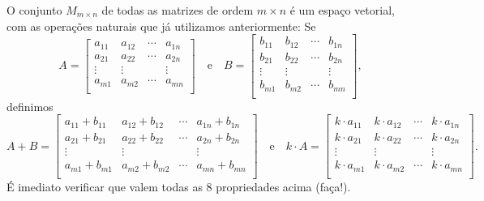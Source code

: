 \documentclass[../livro.tex]{subfiles}  %
\begin{document}
\begin{example}
	O conjunto $M_{m\times n}$ de todas as matrizes de ordem $m\times n$ é um espaço vetorial, com as operações naturais que já utilizamos anteriormente: Se
	\begin{equation}
	A =
	\left[
	\begin{array}{cccc}
	a_{11} & a_{12} & \cdots & a_{1n} \\
	a_{21} & a_{22} & \cdots & a_{2n} \\
	\vdots & \vdots &        & \vdots \\
	a_{m1} & a_{m2} & \cdots & a_{mn} \\
	\end{array}
	\right] \quad \text{e} \quad
	B =
	\left[
	\begin{array}{cccc}
	b_{11} & b_{12} & \cdots & b_{1n} \\
	b_{21} & b_{22} & \cdots & b_{2n} \\
	\vdots & \vdots &        & \vdots \\
	b_{m1} & b_{m2} & \cdots & b_{mn} \\
	\end{array}
	\right],
	\end{equation} definimos
	\begin{equation}
	A + B =
	\left[
	\begin{array}{cccc}
	a_{11} + b_{11} & a_{12} + b_{12} & \cdots & a_{1n} + b_{1n} \\
	a_{21} + b_{21} & a_{22} + b_{22} & \cdots & a_{2n} + b_{2n} \\
	\vdots & \vdots &        & \vdots \\
	a_{m1} + b_{m1} & a_{m2} + b_{m2} & \cdots & a_{mn} + b_{mn} \\
	\end{array}
	\right] \quad \text{e} \quad
	k\cdot A =
	\left[
	\begin{array}{cccc}
	k\cdot a_{11} & k\cdot a_{12} & \cdots & k\cdot a_{1n} \\
	k\cdot a_{21} & k\cdot a_{22} & \cdots & k\cdot a_{2n} \\
	\vdots & \vdots &        & \vdots \\
	k\cdot a_{m1} & k\cdot a_{m2} & \cdots & k\cdot a_{mn} \\
	\end{array}
	\right].
	\end{equation} É imediato verificar que valem todas as 8 propriedades acima (faça!).
\end{example}
\end{document}
